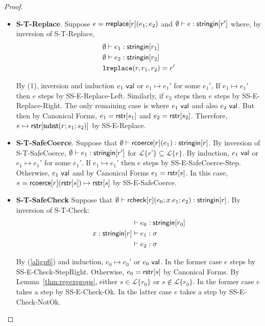 \documentclass[12pt]{article}
\theoremstyle{definition}
\newcommand{\Lagr}{\mathcal{L}}
\newcommand{\lang}[1]{\Lagr\{#1\}}
\newcommand{\rcoerce}[2]{{\sf rcoerce}[#1](#2)}
\newcommand{\sistr}[1]{{\sf rstr}[#1]}   \newcommand{\rstr}[1]{{\sf rstr}[#1]} %
\newcommand{\val}{{\sf val}}
\newcommand{\rcheck}[4]{ {\sf rcheck}[#1](#2;#3;#4) }
\newcommand{\strin}[1]{\sistr{#1}}
\newcommand{\stringin}[1]{{\sf stringin}[#1]}
\newcommand{\lsubst}[3]{{\sf subst}(#1;#2;#3)} %
\newcommand{\lreplace}[3]{{\sf lreplace}(#1; #2; #3)}
\renewcommand{\lreplace}[3]{{\tt lreplace}(#1, #2, #3)}
\begin{document}
\begin{proof}
\begin{itemize}[label=$ $,itemsep=1ex]
\item \textbf{S-T-Replace}.
Suppose $e = {\sf rreplace}[r](e_1;e_2)$ and $\emptyset\vdash e : \stringin{r'}$ where, by inversion of S-T-Replace,
\begin{align}
&\emptyset\vdash e_1 : \stringin{r_1} \\
&\emptyset\vdash e_2 : \stringin{r_2} \\
&\lreplace{r}{r_1}{r_2} = r'
\end{align}

By (1), inversion and induction $e_1 \ \val$ or $e_1 \mapsto e_1'$ for some $e_1'$,
If $e_1 \mapsto e_1'$ then $e$ steps by SS-E-Replace-Left.
Similarly, if $e_2$ steps then $e$ steps by SS-E-Replace-Right.
The only remaining case is where $e_1 \ \val$ and also $e_2 \ \val$.
But then by Canonical Forms, $e_1 = \strin{s_1}$ and $e_2 = \strin{s_2}$.
Therefore, $e \mapsto \rstr{\lsubst{r}{s_1}{s_2}}$ by SS-E-Replace.

\item \textbf{S-T-SafeCoerce}.
Suppose that $\emptyset\vdash \rcoerce{r}{e_1} : \stringin{r}$.
By inversion of S-T-SafeCoerce,
$\emptyset\vdash e_1 : \stringin{r'}$ for $\lang{r'} \subseteq \lang{r}$.%
By induction, $e_1 \ \val$ or $e_1 \mapsto e_1'$ for some $e_1'$.
If $e_1 \mapsto e_1'$ then $e$ steps by SS-E-SafeCoerce-Step.
Otherwise, $e_1 \ \val$ and by Canonical Forms $e_1 = \rstr{s}$.
In this case, $e = \rcoerce{r}{\rstr{s}} \mapsto \rstr{s}$ by SS-E-SafeCoerce.

\item \textbf{S-T-SafeCheck}
Suppose that $\emptyset\vdash \rcheck{r}{e_0}{x.e_1}{e_2} : \stringin{r}$.
By inversion of S-T-Check:
\begin{align}
&\vdash e_0 : \stringin{r_0}  \\
x:\stringin{r} &\vdash e_1 : \sigma \\
&\vdash e_2 : \sigma \label{align6}
\end{align}

By (\ref{align6}) and induction,  $e_0 \mapsto e_0'$ or $e_0 \ \val$.
In the former case $e$ steps by SS-E-Check-StepRight.
Otherwise, $e_0 = \rstr{s}$ by Canonical Forms.
By Lemma~\ref{thm:regexprops}, either $s \in \lang{r_0}$ or $s \not\in\lang{r_0}$.
In the former case $e$ takes a step by SS-E-Check-Ok.
In the latter case $e$ takes a step by SS-E-Check-NotOk.

\end{itemize}

\end{proof}
\end{document}
